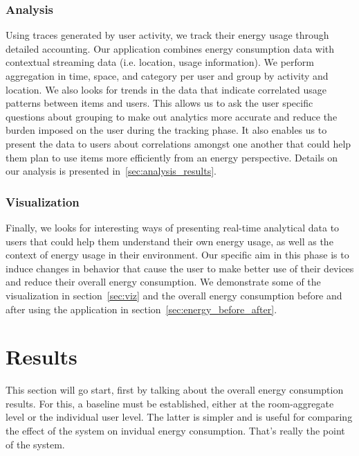 \subsubsection{Analysis}
Using traces generated by user activity, we track their energy usage through detailed accounting.  Our application combines energy consumption data
with contextual streaming data (i.e. location, usage information).  We perform aggregation in time, space, and category per user and group by activity
and location.  We also looks for trends in the data that indicate correlated usage patterns between items and users.  This allows us to ask
the user specific questions about grouping to make out analytics more accurate and reduce the burden imposed on the user during the tracking phase.
It also enables us to present the data to users about correlations amongst one another that could help them plan to use items more efficiently
from an energy perspective.  Details on our analysis is presented in~\ref{sec:analysis_results}.

\subsubsection{Visualization}
Finally, we looks for interesting ways of presenting real-time analytical data to users that could help them understand their own energy usage, as
well as the context of energy usage in their environment.  Our specific aim in this phase is to induce changes in behavior that cause the user to
make better use of their devices and reduce their overall energy consumption.  We demonstrate some of the visualization in section~\ref{sec:viz}
and the overall energy consumption before and after using the application in section~\ref{sec:energy_before_after}.


\section{Results}
This section will go start, first by talking about the overall energy consumption results.  For this, a baseline must be established, either
at the room-aggregate level or the individual user level.  The latter is simpler and is useful for comparing the effect of the system on invidual
energy consumption.  That's really the point of the system.





